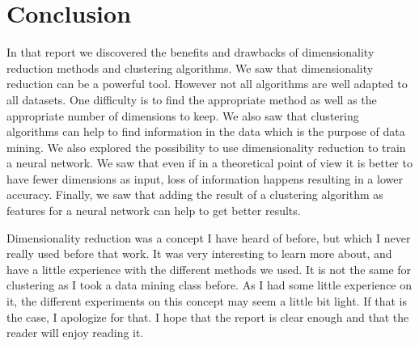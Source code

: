 \documentclass[twocolumn, 10pt]{article}
\begin{document}
	\section{Conclusion}
		In that report we discovered the benefits and drawbacks of dimensionality reduction methods and clustering algorithms. We saw that dimensionality reduction can be a powerful tool. However not all algorithms are well adapted to all datasets. One difficulty is to find the appropriate method as well as the appropriate number of dimensions to keep. We also saw that clustering algorithms can help to find information in the data which is the purpose of data mining. We also explored the possibility to use dimensionality reduction to train a neural network. We saw that even if in a theoretical point of view it is better to have fewer dimensions as input, loss of information happens resulting in a lower accuracy. Finally, we saw that adding the result of a clustering algorithm as features for a neural network can help to get better results.

		Dimensionality reduction was a concept I have heard of before, but which I never really used before that work. It was very interesting to learn more about, and have a little experience with the different methods we used. It is not the same for clustering as I took a data mining class before. As I had some little experience on it, the different experiments on this concept may seem a little bit light. If that is the case, I apologize for that. I hope that the report is clear enough and that the reader will enjoy reading it.
\end{document}
